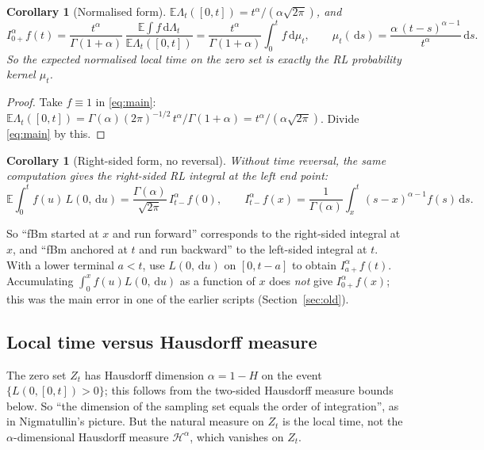 \documentclass[11pt]{article}
\newtheorem{corollary}[theorem]{Corollary}
\theoremstyle{remark}
\theoremstyle{definition}
\newcommand{\E}{\mathbb{E}}
\newcommand{\dd}{\,\mathrm{d}}
\newcommand{\Ia}{I^{\alpha}_{0+}}
\begin{document}
\begin{corollary}[Normalised form]\label{cor:normalised}
$\E\Lambda_t([0,t])=t^\alpha/(\alpha\sqrt{2\pi})$, and
\[
\Ia f(t)=\frac{t^\alpha}{\Gamma(1+\alpha)}\,\frac{\E\int f\dd\Lambda_t}{\E\Lambda_t([0,t])}=\frac{t^\alpha}{\Gamma(1+\alpha)}\int_0^t f\dd\mu_t,\qquad \mu_t(\dd s)=\frac{\alpha\,(t-s)^{\alpha-1}}{t^{\alpha}}\dd s .
\]
So the expected normalised local time on the zero set is exactly the RL probability kernel $\mu_t$.
\end{corollary}

\begin{proof}
Take $f\equiv1$ in \eqref{eq:main}: $\E\Lambda_t([0,t])=\Gamma(\alpha)(2\pi)^{-1/2}\,t^\alpha/\Gamma(1+\alpha)=t^\alpha/(\alpha\sqrt{2\pi})$. Divide \eqref{eq:main} by this.
\end{proof}

\begin{corollary}[Right-sided form, no reversal]\label{cor:right}
Without time reversal, the same computation gives the right-sided RL integral at the left end point:
\[
\E\int_0^t f(u)\,L(0,\dd u)=\frac{\Gamma(\alpha)}{\sqrt{2\pi}}\,I^\alpha_{t-}f(0),\qquad I^\alpha_{t-}f(x)=\frac1{\Gamma(\alpha)}\int_x^t (s-x)^{\alpha-1}f(s)\dd s .
\]
\end{corollary}

So ``fBm started at $x$ and run forward'' corresponds to the right-sided integral at $x$, and ``fBm anchored at $t$ and run backward'' to the left-sided integral at $t$. With a lower terminal $a<t$, use $L(0,\dd u)$ on $[0,t-a]$ to obtain $I^\alpha_{a+}f(t)$. Accumulating $\int_0^x f(u)L(0,\dd u)$ as a function of $x$ does \emph{not} give $\Ia f(x)$; this was the main error in one of the earlier scripts (Section~\ref{sec:old}).

\subsection{Local time versus Hausdorff measure}\label{sec:hausdorff}
The zero set $Z_t$ has Hausdorff dimension $\alpha=1-H$ on the event $\{L(0,[0,t])>0\}$; this follows from the two-sided Hausdorff measure bounds below. So ``the dimension of the sampling set equals the order of integration'', as in Nigmatullin's picture. But the natural measure on $Z_t$ is the local time, not the $\alpha$-dimensional Hausdorff measure $\mathcal H^\alpha$, which vanishes on $Z_t$.
\end{document}
